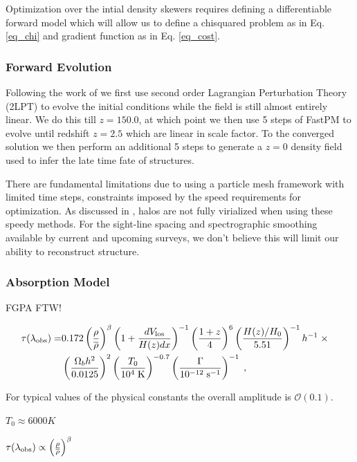 \documentclass[usenatbib,onecolumn]{mnras}
\begin{document}
Optimization over the intial density skewers requires defining a differentiable forward model which will allow us to define a chisquared problem as in Eq. \ref{eq_chi} and gradient function as in Eq. \ref{eq_cost}.

\subsubsection{Forward Evolution}

Following the work of \cite{2018fengseljakzaldarriaga} we first use second order Lagrangian Perturbation Theory (2LPT) to evolve the initial conditions while the field is still almost entirely linear. We do this till $z=150.0$, at which point we then use 5 steps of FastPM \cite{fastPM} to evolve until redshift $z=2.5$ which are linear in scale factor. To the converged solution we then perform an additional 5 steps to generate a $z=0$ density field used to infer the late time fate of structures.

There are fundamental limitations due to using a particle mesh framework with limited time steps, constraints imposed by the speed requirements for optimization. As discussed in \cite{fastPM,2018Dai}, halos are not fully virialized when using these speedy methods. For the sight-line spacing and spectrographic smoothing available by current and upcoming surveys, we don't believe this will limit our ability to reconstruct structure.

\subsubsection{Absorption Model}

FGPA FTW!

\begin{eqnarray}
\tau(\lambda_{\rm obs}) = &
 0.172 \left(\frac{\rho}{\overline \rho}\right)^\beta
\left(1 + \frac{dV_{\rm los}}{H(z) dx}\right)^{-1}
\left(\frac{1+z}{4}\right)^6
\left(\frac{H(z)/H_0}{5.51}\right)^{-1} h^{-1} \;\times & \nonumber \\
& \left(\frac{\Omega_b h^2}{0.0125}\right)^2 
\left(\frac{T_0}{10^4\;{\rm K}}\right)^{-0.7}
\left(\frac{\Gamma}{10^{-12}\;{\rm s}^{-1}}\right)^{-1}\;, & \label{fgpa} 
\end{eqnarray}

For typical values of the physical constants the overall amplitude is $\mathcal{O}(0.1)$. 

$T_0 \approx 6000 K$


$\tau(\lambda_{\rm obs}) \propto \left(\frac{\rho}{\overline \rho}\right)^\beta$
\end{document}
